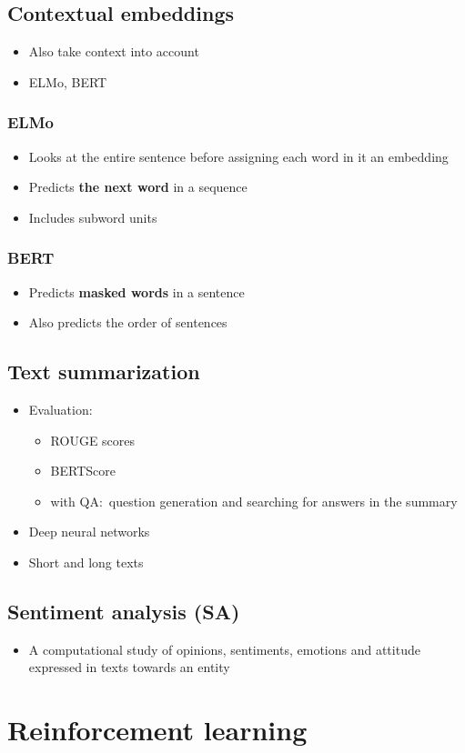 \documentclass{article}
\begin{document}
    \subsection{Contextual embeddings}
    \begin{itemize}
        \item Also take context into account 
        \item ELMo, BERT
    \end{itemize}

        \subsubsection{ELMo}
        \begin{itemize}
            \item Looks at the entire sentence before assigning each word in it an embedding
            \item Predicts \textbf{the next word} in a sequence
            \item Includes subword units
        \end{itemize}

        \subsubsection{BERT}
        \begin{itemize}
            \item Predicts \textbf{masked words} in a sentence
            \item Also predicts the order of sentences
        \end{itemize}

    \subsection{Text summarization}
    \begin{itemize}
        \item Evaluation:
        \begin{itemize}
            \item ROUGE scores
            \item BERTScore
            \item with QA:\ question generation and searching for answers in the summary
        \end{itemize}
        \item Deep neural networks
        \item Short and long texts
    \end{itemize}

    \subsection{Sentiment analysis (SA)}
    \begin{itemize}
        \item A computational study of opinions, sentiments, emotions and attitude expressed in texts towards an entity
    \end{itemize}

    \newpage

\section{Reinforcement learning}
    \newpage
\end{document}
